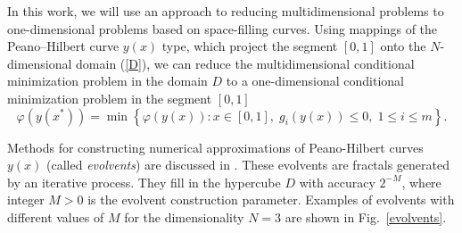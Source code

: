 \documentclass[
11pt,%
tightenlines,%
twoside,%
onecolumn,%
nofloats,%
nobibnotes,%
nofootinbib,%
superscriptaddress,%
noshowpacs,%
centertags]%
{revtex4}
\begin{document}
In this work, we will use an approach to reducing multidimensional
problems to one-dimensional problems based on space-filling curves.
Using mappings of the Peano--Hilbert curve $y(x)$ type, which
project the segment $[0,1]$ onto the $N$-dimensional domain
(\ref{D}), we can reduce the multidimensional conditional
minimization problem in the domain $D$ to a one-dimensional
conditional minimization problem in the segment $[0,1]$
\begin{equation}\label{problem1}
\varphi(y(x^\ast))=\min \left\{\varphi(y(x)): x \in [0,1], \; g_i(y(x))\leq 0, \; 1 \leq i \leq m\right\}.
\end{equation}

Methods for constructing numerical approximations of Peano-Hilbert curves $y(x)$ (called \textit{evolvents}) are discussed in \cite{Sergeyev2013}. These evolvents are fractals generated by an iterative process. They fill in the hypercube $D$ with accuracy $2^{-M}$, where integer $M>0$ is the evolvent construction parameter.
Examples of evolvents with different values of $M$  for the dimensionality $N=3$ are shown in Fig.~\ref{evolvents}.
\end{document}
